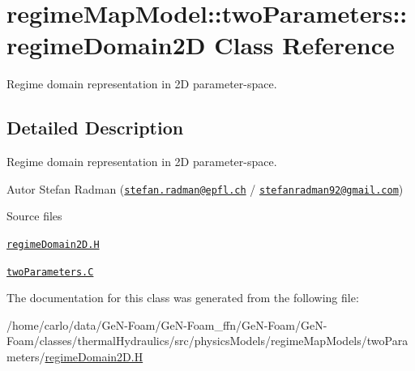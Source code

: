 \hypertarget{classFoam_1_1regimeMapModel_1_1twoParameters_1_1regimeDomain2D}{}\section{regime\+Map\+Model\+:\+:two\+Parameters\+:\+:regime\+Domain2D Class Reference}
\label{classFoam_1_1regimeMapModel_1_1twoParameters_1_1regimeDomain2D}


Regime domain representation in 2D parameter-\/space.  




\subsection{Detailed Description}
Regime domain representation in 2D parameter-\/space. 

\label{_Description}%
 Autor Stefan Radman (\href{mailto:stefan.radman@epfl.ch}{\tt stefan.\+radman@epfl.\+ch} / \href{mailto:stefanradman92@gmail.com}{\tt stefanradman92@gmail.\+com})

\begin{DoxyParagraph}{Source files}

\begin{DoxyItemize}
\item \href{../../../home/carlo/data/GeN-Foam/GeN-Foam_ffn/GeN-Foam/GeN-Foam/classes/thermalHydraulics/src/physicsModels/regimeMapModels/twoParameters/regimeDomain2D.H}{\tt regime\+Domain2\+D.\+H} 
\item \href{../../../home/carlo/data/GeN-Foam/GeN-Foam_ffn/GeN-Foam/GeN-Foam/classes/thermalHydraulics/src/physicsModels/regimeMapModels/twoParameters/twoParameters.C}{\tt two\+Parameters.\+C} 
\end{DoxyItemize}
\end{DoxyParagraph}


The documentation for this class was generated from the following file\+:\begin{DoxyCompactItemize}
\item 
/home/carlo/data/\+Ge\+N-\/\+Foam/\+Ge\+N-\/\+Foam\+\_\+ffn/\+Ge\+N-\/\+Foam/\+Ge\+N-\/\+Foam/classes/thermal\+Hydraulics/src/physics\+Models/regime\+Map\+Models/two\+Parameters/\hyperlink{regimeDomain2D_8H}{regime\+Domain2\+D.\+H}\end{DoxyCompactItemize}
